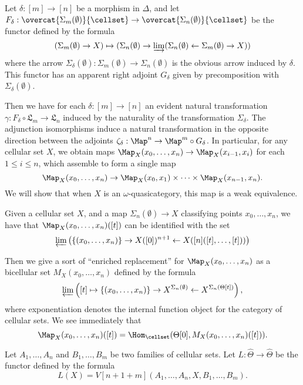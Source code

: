 Let \(\delta:[m]\to [n]\) be a morphism in \(\Delta\), and let \(F_\delta:\overcat{\Sigma_m(\emptyset)}{\cellset}\to \overcat{\Sigma_n(\emptyset)}{\cellset}\) be the functor defined by the formula 
\[(\Sigma_m(\emptyset)\to X) \mapsto (\Sigma_n(\emptyset)\to \varinjlim( \Sigma_n(\emptyset)\leftarrow \Sigma_m(\emptyset)\to X ))\]
where the arrow \(\Sigma_\delta(\emptyset):\Sigma_m(\emptyset)\to \Sigma_n(\emptyset)\) is the obvious arrow induced by \(\delta\).  This functor has an apparent right adjoint \(G_\delta\) given by precomposition with \(\Sigma_\delta(\emptyset)\).  

Then we have for each \(\delta:[m]\to [n]\) an evident natural transformation \(\gamma:F_\delta \circ \mathfrak{L}_m\to \mathfrak{L}_n\) induced by the naturality of the transformation \(\Sigma_\delta\).  The adjunction isomorphisms induce a natural transformation in the opposite direction between the adjoints \(\zeta_\delta:\Map^n\to \Map^m\circ G_\delta\).  In particular, for any cellular set \(X\), we obtain maps \(\Map_X(x_0,\dots,x_n)\to \Map_X(x_{i-1},x_i)\) for each \(1\leq i\leq n\), which assemble to form a single map \[\Map_X(x_0,\dots,x_n)\to \Map_X(x_0,x_1) \times \dots \times \Map_X(x_{n-1},x_n).\]  We will show that when \(X\) is an \(\omega\)-quasicategory, this map is a weak equivalence. 

\begin{prop} Given a cellular set \(X\), and a map \(\Sigma_n(\emptyset)\to X\) classifying points \(x_0,\dots,x_n\), we have that \(\Map_X(x_0,\dots,x_n)([t])\) can be identified with the set 
\[\varprojlim\left (\{(x_0,\dots,x_n)\}\to X([0])^{n+1} \leftarrow X([n]([t],\dots,[t]))\right )\]
\end{prop} 

Then we give a sort of ``enriched replacement'' for \(\Map_X(x_0,\dots,x_n)\) as a bicellular set \(M_X(x_0,\dots,x_n)\) defined by the formula 
\[\varprojlim \left ([t]\mapsto \{(x_0,\dots,x_n)\}\to X^{\Sigma_n(\emptyset)} \leftarrow X^{\Sigma_n(\Theta[t])}\right ),\]
where exponentiation denotes the internal function object for the category of cellular sets.  We see immediately that \[\Map_X(x_0,\dots,x_n)([t])=\Hom_{\cellset}(\Theta[0],M_X(x_0,\dots,x_n)([t])).\]

Let \(A_1,\dots, A_n\) and \(B_1,\dots, B_m\) be two families of cellular sets.  Let \(L:\widehat{\Theta}\to \widehat{\Theta}\) be the functor defined by the formula \[L(X)=V[n+1+m](A_1,\dots, A_n, X, B_1,\dots, B_m).\]  

